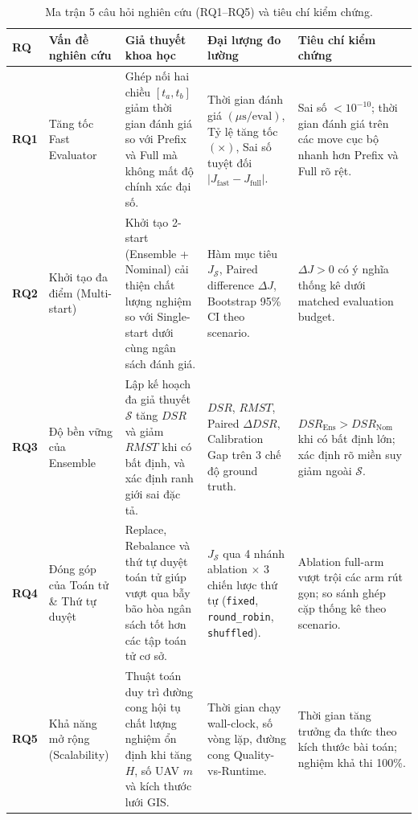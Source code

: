 \documentclass[12pt,a4paper]{article}
\begin{document}
\begin{table}[H]
\centering
\caption{Ma trận 5 câu hỏi nghiên cứu (RQ1--RQ5) và tiêu chí kiểm chứng.}
\label{tab:rq_matrix}
\scriptsize
\begin{tabular}{@{}p{1.4cm}p{3.2cm}p{3.8cm}p{3.2cm}p{3.0cm}@{}}
\toprule
\textbf{RQ} & \textbf{Vấn đề nghiên cứu} & \textbf{Giả thuyết khoa học} & \textbf{Đại lượng đo lường} & \textbf{Tiêu chí kiểm chứng} \\
\midrule
\textbf{RQ1} &
Tăng tốc Fast Evaluator &
Ghép nối hai chiều $[t_a, t_b]$ giảm thời gian đánh giá so với Prefix và Full mà không mất độ chính xác đại số. &
Thời gian đánh giá $(\mu\text{s/eval})$, Tỷ lệ tăng tốc $(\times)$, Sai số tuyệt đối $|J_{\mathrm{fast}} - J_{\mathrm{full}}|$. &
Sai số $< 10^{-10}$; thời gian đánh giá trên các move cục bộ nhanh hơn Prefix và Full rõ rệt. \\
\midrule
\textbf{RQ2} &
Khởi tạo đa điểm (Multi-start) &
Khởi tạo 2-start (Ensemble + Nominal) cải thiện chất lượng nghiệm so với Single-start dưới cùng ngân sách đánh giá. &
Hàm mục tiêu $J_{\mathcal{S}}$, Paired difference $\Delta J$, Bootstrap 95\% CI theo scenario. &
$\Delta J > 0$ có ý nghĩa thống kê dưới matched evaluation budget. \\
\midrule
\textbf{RQ3} &
Độ bền vững của Ensemble &
Lập kế hoạch đa giả thuyết $\mathcal{S}$ tăng $DSR$ và giảm $RMST$ khi có bất định, và xác định ranh giới sai đặc tả. &
$DSR$, $RMST$, Paired $\Delta DSR$, Calibration Gap trên 3 chế độ ground truth. &
$DSR_{\mathrm{Ens}} > DSR_{\mathrm{Nom}}$ khi có bất định lớn; xác định rõ miền suy giảm ngoài $\mathcal{S}$. \\
\midrule
\textbf{RQ4} &
Đóng góp của Toán tử \& Thứ tự duyệt &
Replace, Rebalance và thứ tự duyệt toán tử giúp vượt qua bẫy bão hòa ngân sách tốt hơn các tập toán tử cơ sở. &
$J_{\mathcal{S}}$ qua 4 nhánh ablation $\times$ 3 chiến lược thứ tự (\texttt{fixed}, \texttt{round\_robin}, \texttt{shuffled}). &
Ablation full-arm vượt trội các arm rút gọn; so sánh ghép cặp thống kê theo scenario. \\
\midrule
\textbf{RQ5} &
Khả năng mở rộng (Scalability) &
Thuật toán duy trì đường cong hội tụ chất lượng nghiệm ổn định khi tăng $H$, số UAV $m$ và kích thước lưới GIS. &
Thời gian chạy wall-clock, số vòng lặp, đường cong Quality-vs-Runtime. &
Thời gian tăng trưởng đa thức theo kích thước bài toán; nghiệm khả thi 100\%. \\
\bottomrule
\end{tabular}
\end{table}
\end{document}
